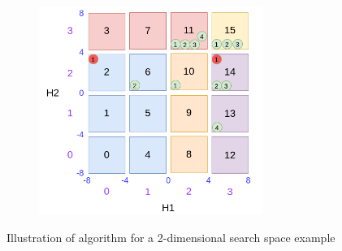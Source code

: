 \begin{figure}
\begin{subfigure}{0.45\textwidth}
		\includegraphics[width=0.8\textwidth]{figures/draw/h.png}
		\caption{}
		\label{fig:dsbo-example-h}
	\end{subfigure}
	\caption{Illustration of algorithm for a 2-dimensional search space example}
	\label{fig:dsbo-example}
\end{figure}

